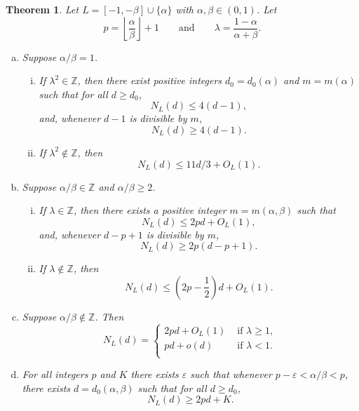 \documentclass[reqno, 11pt]{amsart}
\newtheorem{theorem}{Theorem}[section]
\theoremstyle{definition}
\theoremstyle{remark}
\newcommand{\floor}[1]{\left\lfloor #1 \right\rfloor}
\newcommand{\ZZ}{\mathbb{Z}}
\begin{document}
\begin{theorem} \label{thm:detail}
Let $L = [-1, -\beta] \cup \{\alpha\}$ with $\alpha,\beta \in (0,1)$. 
Let 
\[
p = \floor{\frac{\alpha}{\beta}} + 1
\qquad 
\text{and} \qquad
\lambda = \frac{1-\alpha}{\alpha +\beta}.
\]
\begin{enumerate}[(a)]
    \item \label{itm:detail-1}
    Suppose $\alpha/\beta = 1$. 
        \begin{enumerate}[(i)]
            \item \label{itm:detail-1int} If $\lambda^2 \in \ZZ$, then there exist positive integers $d_0 = d_0(\alpha)$ and $m = m(\alpha)$ such that for all $d \ge d_0$,
            \[
            N_L(d) \le 4(d-1),
            \]
            and, whenever $d-1$ is divisible by $m$,
            \[
            N_L(d) \ge 4(d-1).
            \]
            \item \label{itm:detail-1non} If $\lambda^2 \notin \ZZ$, then 
            \[N_L(d) \le 11d/3 + O_L(1).\]
        \end{enumerate}
    \item \label{itm:detail-2} Suppose $\alpha/\beta \in \ZZ$ and $\alpha/\beta \geq 2$.
        \begin{enumerate}[(i)]
            \item \label{itm:detail-2int}
                If $\lambda \in \ZZ$, then there exists a positive integer $m = m(\alpha, \beta)$ such that
                \[
                N_L(d) \le 2pd + O_L(1),
                \]
                and, whenever $d-p+1$ is divisible by $m$,
                \[
                N_L(d) \ge 2p(d-p+1).
                \]
            \item \label{itm:detail-2non} If $\lambda \notin \ZZ$, then 
            \[
            N_L(d) \le \left(2p - \frac{1}{2}\right)d + O_L(1).
            \]
        \end{enumerate}
    \item  \label{itm:detail-non} 
    Suppose $\alpha / \beta \notin \ZZ$. Then
    \[
        N_L(d) = \begin{cases}
                2pd + O_L(1) & \text{ if } \lambda \geq 1,\\
                pd + o(d) & \text{ if } \lambda < 1. \\
                 \end{cases}
    \]
    \item \label{itm:error-term} For all integers $p$ and $K$ there exists $\varepsilon$ such that whenever $p-\varepsilon < \alpha/\beta < p$, there exists $d = d_0(\alpha,\beta)$ such that for all $d \ge d_0$,
            \[
            N_L(d) \ge 2pd + K.
            \]
\end{enumerate}
\end{theorem}
\end{document}
